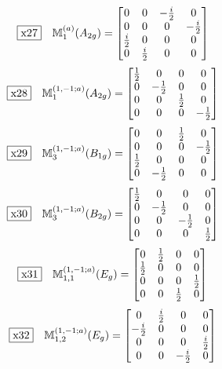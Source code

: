\documentclass[fleqn,10pt,landscape]{jsarticle}
\begin{document}
\begin{dmath*}
\fbox{x27}\quad \mathbb{M}_{1}^{(a)}(A_{2g})=\begin{bmatrix} 0 & 0 & - \frac{i}{2} & 0 \\ 0 & 0 & 0 & - \frac{i}{2} \\ \frac{i}{2} & 0 & 0 & 0 \\ 0 & \frac{i}{2} & 0 & 0 \end{bmatrix}
\end{dmath*}
\begin{dmath*}
\fbox{x28}\quad \mathbb{M}_{1}^{(1,-1;a)}(A_{2g})=\begin{bmatrix} \frac{1}{2} & 0 & 0 & 0 \\ 0 & - \frac{1}{2} & 0 & 0 \\ 0 & 0 & \frac{1}{2} & 0 \\ 0 & 0 & 0 & - \frac{1}{2} \end{bmatrix}
\end{dmath*}
\begin{dmath*}
\fbox{x29}\quad \mathbb{M}_{3}^{(1,-1;a)}(B_{1g})=\begin{bmatrix} 0 & 0 & \frac{1}{2} & 0 \\ 0 & 0 & 0 & - \frac{1}{2} \\ \frac{1}{2} & 0 & 0 & 0 \\ 0 & - \frac{1}{2} & 0 & 0 \end{bmatrix}
\end{dmath*}
\begin{dmath*}
\fbox{x30}\quad \mathbb{M}_{3}^{(1,-1;a)}(B_{2g})=\begin{bmatrix} \frac{1}{2} & 0 & 0 & 0 \\ 0 & - \frac{1}{2} & 0 & 0 \\ 0 & 0 & - \frac{1}{2} & 0 \\ 0 & 0 & 0 & \frac{1}{2} \end{bmatrix}
\end{dmath*}
\begin{dmath*}
\fbox{x31}\quad \mathbb{M}_{1,1}^{(1,-1;a)}(E_{g})=\begin{bmatrix} 0 & \frac{1}{2} & 0 & 0 \\ \frac{1}{2} & 0 & 0 & 0 \\ 0 & 0 & 0 & \frac{1}{2} \\ 0 & 0 & \frac{1}{2} & 0 \end{bmatrix}
\end{dmath*}
\begin{dmath*}
\fbox{x32}\quad \mathbb{M}_{1,2}^{(1,-1;a)}(E_{g})=\begin{bmatrix} 0 & \frac{i}{2} & 0 & 0 \\ - \frac{i}{2} & 0 & 0 & 0 \\ 0 & 0 & 0 & \frac{i}{2} \\ 0 & 0 & - \frac{i}{2} & 0 \end{bmatrix}
\end{dmath*}
\end{document}
